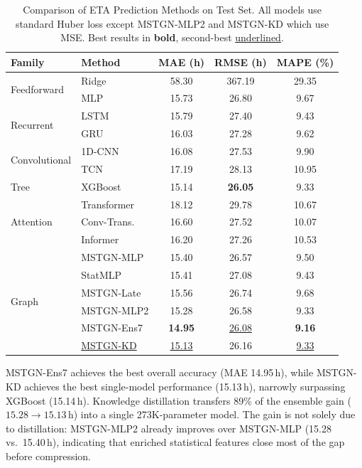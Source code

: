 \documentclass[conference]{IEEEtran}
\begin{document}
\begin{table}[t]
    \centering
    \caption{Comparison of ETA Prediction Methods on Test Set. All models use standard Huber loss except MSTGN-MLP2 and MSTGN-KD which use MSE. Best results in \textbf{bold}, second-best \underline{underlined}.}
    \label{tab:main_results}
    \begin{tabular}{llccc}
        \toprule
        \textbf{Family} & \textbf{Method} & \textbf{MAE (h)} & \textbf{RMSE (h)} & \textbf{MAPE (\%)} \\
        \midrule
        \multirow{2}{*}{Feedforward} & Ridge & 58.30 & 367.19 & 29.35 \\
        & MLP & 15.73 & 26.80 & 9.67 \\
        \midrule
        \multirow{2}{*}{Recurrent} & LSTM & 15.79 & 27.40 & 9.43 \\
        & GRU & 16.03 & 27.28 & 9.62 \\
        \midrule
        \multirow{2}{*}{Convolutional} & 1D-CNN & 16.08 & 27.53 & 9.90 \\
        & TCN & 17.19 & 28.13 & 10.95 \\
        \midrule
        Tree & XGBoost & 15.14 & \textbf{26.05} & 9.33 \\
        \midrule
        \multirow{3}{*}{Attention} & Transformer & 18.12 & 29.78 & 10.67 \\
        & Conv-Trans. & 16.60 & 27.52 & 10.07 \\
        & Informer & 16.20 & 27.26 & 10.53 \\
        \midrule
        \multirow{7}{*}{Graph} & MSTGN-MLP & 15.40 & 26.57 & 9.50 \\
        & StatMLP & 15.41 & 27.08 & 9.43 \\
        & MSTGN-Late & 15.56 & 26.74 & 9.68 \\
        & MSTGN-MLP2 & 15.28 & 26.58 & 9.33 \\
        & MSTGN-Ens7 & \textbf{14.95} & \underline{26.08} & \textbf{9.16} \\
        & \underline{MSTGN-KD} & \underline{15.13} & 26.16 & \underline{9.33} \\
        \bottomrule
    \end{tabular}
\end{table}

MSTGN-Ens7 achieves the best overall accuracy (MAE 14.95\,h), while MSTGN-KD achieves the best single-model performance (15.13\,h), narrowly surpassing XGBoost (15.14\,h). Knowledge distillation transfers 89\% of the ensemble gain ($15.28 \to 15.13$\,h) into a single 273K-parameter model. The gain is not solely due to distillation: MSTGN-MLP2 already improves over MSTGN-MLP (15.28 vs.\ 15.40\,h), indicating that enriched statistical features close most of the gap before compression.
\end{document}
